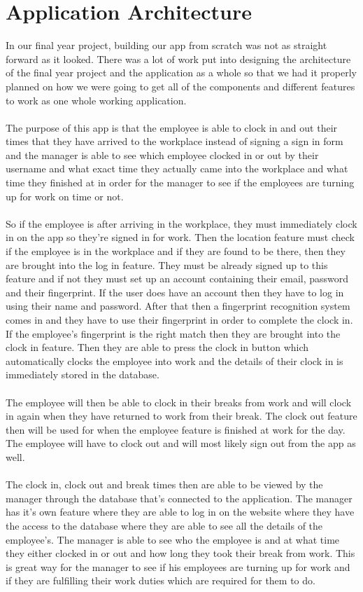 \section{Application Architecture}
In our final year project, building our app from scratch was not as straight forward as it looked. There was a lot of work put into designing the architecture of the final year project and the application as a whole so that we had it properly planned on how we were going to get all of the components and different features to work as one whole working application. 
\\
\\
The purpose of this app is that the employee is able to clock in and out their times that they have arrived to the workplace instead of signing a sign in form and the manager is able to see which employee clocked in or out by their username and what exact time they actually came into the workplace and what time they finished at in order for the manager to see if the employees are turning up for work on time or not.
\\
\\
So if the employee is after arriving in the workplace, they must immediately clock in on the app so they’re signed in for work. Then the location feature must check if the employee is in the workplace and if they are found to be there, then they are brought into the log in feature. They must be already signed up to this feature and if not they must set up an account containing their email, password and their fingerprint. If the user does have an account then they have to log in using their name and password. After that then a fingerprint recognition system comes in and they have to use their fingerprint in order to complete the clock in. If the employee’s fingerprint is the right match then they are brought into the clock in feature. Then they are able to press the clock in button which automatically clocks the employee into work and the details of their clock in is immediately stored in the database.
\\
\\
The employee will then be able to clock in their breaks from work and will clock in again when they have returned to work from their break. The clock out feature then will be used for when the employee feature is finished at work for the day. The employee will have to clock out and will most likely sign out from the app as well.
\\
\\
The clock in, clock out and break times then are able to be viewed by the manager through the database that’s connected to the application. The manager has it’s own feature where they are able to log in on the website where they have the access to the database where they are able to see all the details of the employee’s. The manager is able to see who the employee is and at what time they either clocked in or out and how long they took their break from work. This is great way for the manager to see if his employees are turning up for work and if they are fulfilling their work duties which are required for them to do.

